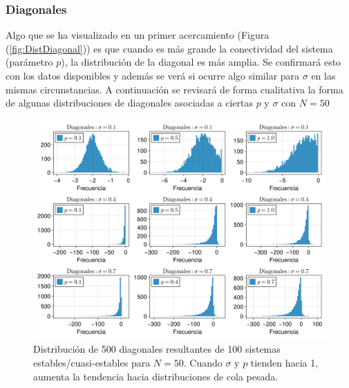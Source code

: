 \documentclass[a4paper,11pt]{book}
\theoremstyle{plain}
\theoremstyle{definition}
\begin{document}
\subsubsection*{Diagonales}

Algo que se ha visualizado en un primer acercamiento (Figura (\ref{fig:DistDiagonal})) es que cuando es más grande la conectividad del sistema (parámetro $p$), la distribución de la diagonal es más amplia. Se confirmará esto con los datos disponibles y además se verá si ocurre algo similar para $\sigma$ en las mismas circunstancias. A continuación se revisará de forma cualitativa la forma de algunas distribuciones de diagonales asociadas a ciertas $p$ y $\sigma$ con $N=50$
\begin{figure}[h!]
	\centering
	\includegraphics[scale=0.24]{../Imagenes/distDiagonales50}
	\caption{Distribución de 500 diagonales resultantes de 100 sistemas estables/cuasi-estables para $N=50$. Cuando $\sigma$ y $p$ tienden hacia 1, aumenta la tendencia hacia distribuciones de cola pesada.}
	\label{fig:distDiagonales50}
\end{figure}
\end{document}
